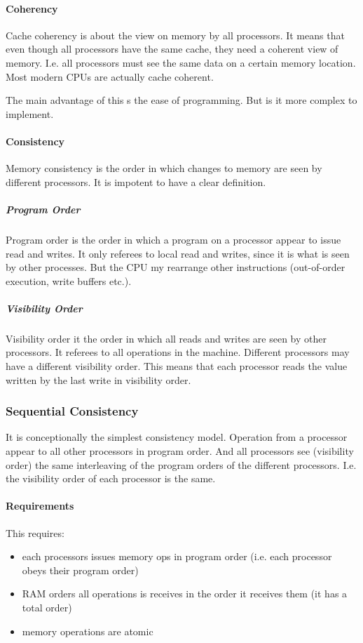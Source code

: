 \paragraph{Coherency}
Cache coherency is about the view on memory by all processors. It means that even though all processors have the same cache, they need a coherent view of memory. I.e. all processors must see the same data on a certain memory location. Most modern CPUs are actually cache coherent. 

The main advantage of this s the ease of programming. But is it more complex to implement.

\paragraph{Consistency}
Memory consistency is the order in which changes to memory are seen by different processors. It is impotent to have a clear definition.

\subparagraph{Program Order}
Program order is the order in which a program on a processor appear to issue read and writes. It only referees to local read and writes, since it is what is seen by other processes. But the CPU my rearrange other instructions (out-of-order execution, write buffers etc.).

\subparagraph{Visibility Order}
Visibility order it the order in which all reads and writes are seen by other processors. It referees to all operations in the machine. Different processors may have a different visibility order. This means that each processor reads the value written by the last write in visibility order.

\subsubsection{Sequential Consistency}
It is conceptionally the simplest consistency model. Operation from a processor appear to all other processors in program order. And all processors see (visibility order) the same interleaving of the program orders of the different processors. I.e. the visibility order of each processor is the same.

\paragraph{Requirements}
This requires:
\begin{itemize}
    \item each processors issues memory ops in program order (i.e. each processor obeys their program order)
    \item RAM orders all operations is receives in the order it receives them (it has a total order)
    \item memory operations are atomic
\end{itemize}

